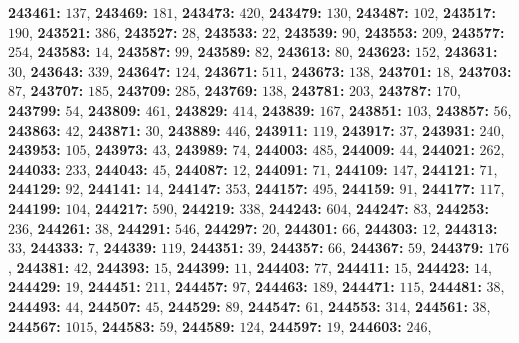 \textsf{\bfseries 243461:} $137$, \textsf{\bfseries 243469:} $181$, \textsf{\bfseries 243473:} $420$, \textsf{\bfseries 243479:} $130$, \textsf{\bfseries 243487:} $102$, \textsf{\bfseries 243517:} $190$, \textsf{\bfseries 243521:} $386$, \textsf{\bfseries 243527:} $28$, \textsf{\bfseries 243533:} $22$, \textsf{\bfseries 243539:} $90$, \textsf{\bfseries 243553:} $209$, \textsf{\bfseries 243577:} $254$, \textsf{\bfseries 243583:} $14$, \textsf{\bfseries 243587:} $99$, \textsf{\bfseries 243589:} $82$, \textsf{\bfseries 243613:} $80$, \textsf{\bfseries 243623:} $152$, \textsf{\bfseries 243631:} $30$, \textsf{\bfseries 243643:} $339$, \textsf{\bfseries 243647:} $124$, \textsf{\bfseries 243671:} $511$, \textsf{\bfseries 243673:} $138$, \textsf{\bfseries 243701:} $18$, \textsf{\bfseries 243703:} $87$, \textsf{\bfseries 243707:} $185$, \textsf{\bfseries 243709:} $285$, \textsf{\bfseries 243769:} $138$, \textsf{\bfseries 243781:} $203$, \textsf{\bfseries 243787:} $170$, \textsf{\bfseries 243799:} $54$, \textsf{\bfseries 243809:} $461$, \textsf{\bfseries 243829:} $414$, \textsf{\bfseries 243839:} $167$, \textsf{\bfseries 243851:} $103$, \textsf{\bfseries 243857:} $56$, \textsf{\bfseries 243863:} $42$, \textsf{\bfseries 243871:} $30$, \textsf{\bfseries 243889:} $446$, \textsf{\bfseries 243911:} $119$, \textsf{\bfseries 243917:} $37$, \textsf{\bfseries 243931:} $240$, \textsf{\bfseries 243953:} $105$, \textsf{\bfseries 243973:} $43$, \textsf{\bfseries 243989:} $74$, \textsf{\bfseries 244003:} $485$, \textsf{\bfseries 244009:} $44$, \textsf{\bfseries 244021:} $262$, \textsf{\bfseries 244033:} $233$, \textsf{\bfseries 244043:} $45$, \textsf{\bfseries 244087:} $12$, \textsf{\bfseries 244091:} $71$, \textsf{\bfseries 244109:} $147$, \textsf{\bfseries 244121:} $71$, \textsf{\bfseries 244129:} $92$, \textsf{\bfseries 244141:} $14$, \textsf{\bfseries 244147:} $353$, \textsf{\bfseries 244157:} $495$, \textsf{\bfseries 244159:} $91$, \textsf{\bfseries 244177:} $117$, \textsf{\bfseries 244199:} $104$, \textsf{\bfseries 244217:} $590$, \textsf{\bfseries 244219:} $338$, \textsf{\bfseries 244243:} $604$, \textsf{\bfseries 244247:} $83$, \textsf{\bfseries 244253:} $236$, \textsf{\bfseries 244261:} $38$, \textsf{\bfseries 244291:} $546$, \textsf{\bfseries 244297:} $20$, \textsf{\bfseries 244301:} $66$, \textsf{\bfseries 244303:} $12$, \textsf{\bfseries 244313:} $33$, \textsf{\bfseries 244333:} $7$, \textsf{\bfseries 244339:} $119$, \textsf{\bfseries 244351:} $39$, \textsf{\bfseries 244357:} $66$, \textsf{\bfseries 244367:} $59$, \textsf{\bfseries 244379:} $176$, \textsf{\bfseries 244381:} $42$, \textsf{\bfseries 244393:} $15$, \textsf{\bfseries 244399:} $11$, \textsf{\bfseries 244403:} $77$, \textsf{\bfseries 244411:} $15$, \textsf{\bfseries 244423:} $14$, \textsf{\bfseries 244429:} $19$, \textsf{\bfseries 244451:} $211$, \textsf{\bfseries 244457:} $97$, \textsf{\bfseries 244463:} $189$, \textsf{\bfseries 244471:} $115$, \textsf{\bfseries 244481:} $38$, \textsf{\bfseries 244493:} $44$, \textsf{\bfseries 244507:} $45$, \textsf{\bfseries 244529:} $89$, \textsf{\bfseries 244547:} $61$, \textsf{\bfseries 244553:} $314$, \textsf{\bfseries 244561:} $38$, \textsf{\bfseries 244567:} $1015$, \textsf{\bfseries 244583:} $59$, \textsf{\bfseries 244589:} $124$, \textsf{\bfseries 244597:} $19$, \textsf{\bfseries 244603:} $246$, 
